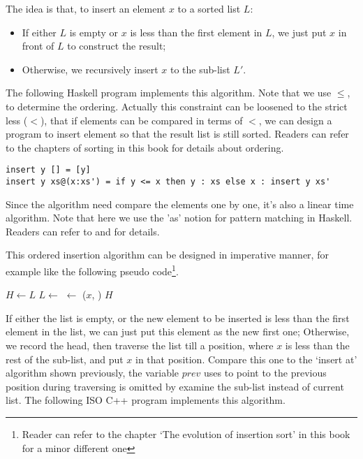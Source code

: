 \documentclass[b5paper]{article}
\begin{document}
The idea is that, to insert an element $x$ to a sorted list $L$:

\begin{itemize}
\item If either $L$ is empty or $x$ is less than the first element in $L$, we just put $x$ in front of $L$ to construct the result;
\item Otherwise, we recursively insert $x$ to the sub-list $L'$.
\end{itemize}

The following Haskell program implements this algorithm. Note that we use $\leq$, to determine the ordering. Actually this
constraint can be loosened to the strict less ($<$), that if elements can be compared in terms of $<$, we can design a program
to insert element so that the result list is still sorted. Readers can refer to the chapters of sorting in this book for details about
ordering.

\lstset{language=Haskell}
\begin{lstlisting}
insert y [] = [y]
insert y xs@(x:xs') = if y <= x then y : xs else x : insert y xs'
\end{lstlisting}

Since the algorithm need compare the elements one by one, it's also a linear time algorithm. Note that here we use the 'as'
notion for pattern matching in Haskell. Readers can refer to \cite{learn-haskell} and \cite{algo-fp} for details.

This ordered insertion algorithm can be designed in imperative manner, for example like the following pseudo code\footnote{Reader
can refer to the chapter `The evolution of insertion sort' in this book for a minor different one}.

\begin{algorithmic}[1]
    \State \Return {}
  \EndIf
  \State $H \gets L$
    \State $L \gets $ 
  \EndWhile
  \State {} $\gets$ ($x$, )
  \State \Return $H$
\EndFunction
\end{algorithmic}

If either the list is empty, or the new element to be inserted is less than the first element in the list, we
can just put this element as the new first one; Otherwise, we record the head, then traverse the list till
a position, where $x$ is less than the rest of the sub-list, and put $x$ in that position. Compare this one
to the `insert at' algorithm shown previously, the variable $prev$ uses to point to the previous position during
traversing is omitted by examine the sub-list instead of current list. The following ISO C++ program implements
this algorithm.
\end{document}

